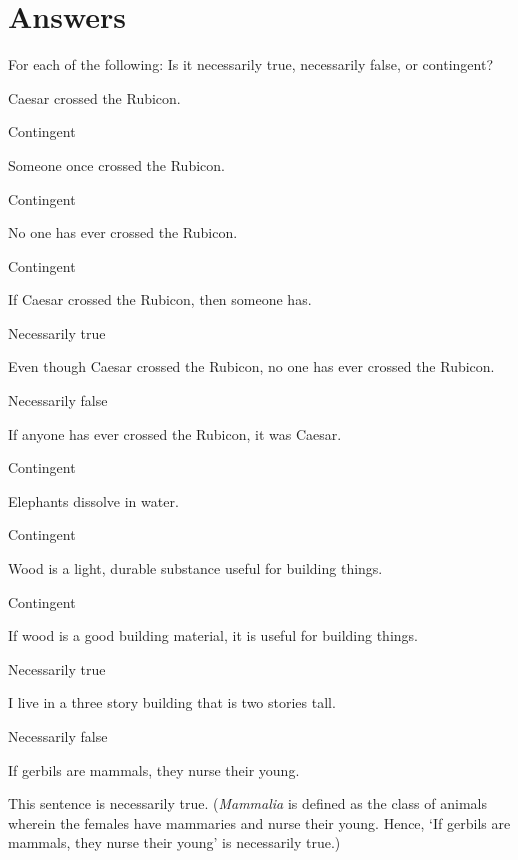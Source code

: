 \section{Answers}
\setcounter{ProbPart}{0}

\problempart
\label{pr.EnglishTautology}
For each of the following: Is it necessarily true, necessarily false, or contingent?
\begin{earg}
\item Caesar crossed the Rubicon.
\item[] Contingent\smallskip
\item Someone once crossed the Rubicon.
\item[] Contingent\smallskip
\item No one has ever crossed the Rubicon.
\item[] Contingent\smallskip
\item If Caesar crossed the Rubicon, then someone has.
\item[] Necessarily true\smallskip
\item Even though Caesar crossed the Rubicon, no one has ever crossed the Rubicon.
\item[] Necessarily false\smallskip
\item If anyone has ever crossed the Rubicon, it was Caesar.
\item[] Contingent\smallskip

\item Elephants dissolve in water.
\item[] Contingent\smallskip
\item Wood is a light, durable substance useful for building things.
\item[] Contingent\smallskip
\item If wood is a good building material, it is useful for building things.
\item[] Necessarily true\smallskip
\item I live in a three story building that is two stories tall.
\item[] Necessarily false\smallskip
\item If gerbils are mammals, they nurse their young.
\item[] This sentence is necessarily true. (\textit{Mammalia} is defined as the class of animals wherein the females have mammaries and nurse their young. Hence, `If gerbils are mammals, they nurse their young' is necessarily true.)
\end{earg}

